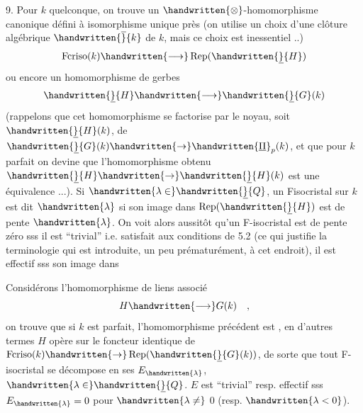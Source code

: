 9. Pour $k$ quelconque, on trouve un  $\handwritten{\otimes}$-homomorphisme canonique  défini à isomorphisme unique près (on utilise un choix d'une clôture algébrique $\handwritten{\overline}{k}$ de $k$, mais ce choix est inessentiel ..)
\[
\operatorname{Fcriso}(k)\handwritten{\longrightarrow}\operatorname{Rep}(\handwritten{\underline}{H})
\]
ou encore un homomorphisme de gerbes
\[
\handwritten{\underline}{H}\handwritten{\longrightarrow}\handwritten{\underline}{G}(k)
\]
(rappelons que cet homomorphisme se factorise par le noyau, soit  $\handwritten{\underline}{H}(k)$, de $\handwritten{\underline}{G}(k)\handwritten{\to}\handwritten{\underline{\Pi}}_p(k)$, et que pour $k$ parfait on devine que l'homomorphisme obtenu $\handwritten{\underline}{H}\handwritten{\to}\handwritten{\underline}{H}(k)$ est une équivalence ...). Si $\handwritten{\lambda\in}\handwritten{\underline}{Q}$, un F\deleted{(}\handwritten{-}isocristal sur $k$ est dit   $\handwritten{\lambda}$ si son image dans $\operatorname{Rep}(\handwritten{\underline}{H})$ est de pente $\handwritten{\lambda}$. On voit alors aussitôt qu'un F-isocristal est de pente zéro sss il est ``trivial'' i.e. satisfait aux conditions de 5.2 (ce qui justifie la terminologie qui est introduite, un peu prématurément, à cet endroit), il est effectif sss son image dans 

Considérons l'homomorphisme de liens associé
\[
H\handwritten{\longrightarrow}G(k)\quad ,
\]
on trouve  que si $k$ est parfait, l'homomorphisme précédent est , en d'autres termes $H$ opère sur le foncteur identique de $\operatorname{Fcriso}(k)\handwritten{\to}\operatorname{Rep}(\handwritten{\underline}{G}(k))$, de sorte que tout F-isocristal  se décompose en ses  $E_{\handwritten{\lambda}}$, $\handwritten{\lambda\in}\handwritten{\underline}{Q}$. $E$ est ``trivial'' resp. effectif sss $E_{\handwritten{\lambda}}=0$ pour $\handwritten{\lambda\ne}$ 0 (resp. $\handwritten{\lambda<0}$).

